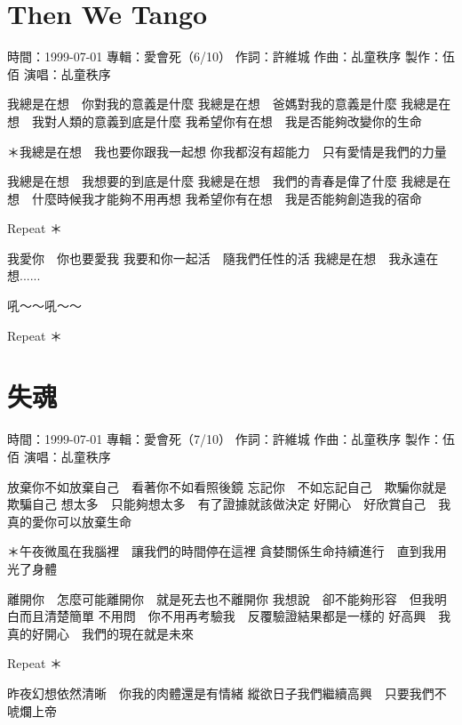 \documentclass[UTF8,a4paper,oneside,twocolumn,12pt]{ctexbook}
\newcommand{\infopair}[2]{\textbullet #1：#2}
\newcommand{\zc}[1][伍佰]{\infopair{作詞}{#1}}
\newcommand{\zq}[1][伍佰]{\infopair{作曲}{#1}}
\newcommand{\zj}[1]{\infopair{專輯}{#1}}
\newcommand{\zz}[1]{\infopair{製作}{#1}}
\newcommand{\sj}[1]{\infopair{時間}{#1}}
\newenvironment{info}{\begin{flushleft}\kaishu
	}
	{\end{flushleft}\normalsize\yahei\par}
\newenvironment{lyric}{
	}
{}
\begin{document}
\section{Then We Tango}
\begin{info}
	\sj{1999-07-01}
	\zj{愛會死（6/10）}
	\zc[許維城]
	\zq[乩童秩序]
	\zz{伍佰}
	\infopair{演唱}{乩童秩序}
\end{info}
\begin{lyric}
	我總是在想　你對我的意義是什麼
	我總是在想　爸媽對我的意義是什麼
	我總是在想　我對人類的意義到底是什麼
	我希望你有在想　我是否能夠改變你的生命

	＊我總是在想　我也要你跟我一起想
	你我都沒有超能力　只有愛情是我們的力量

	我總是在想　我想要的到底是什麼
	我總是在想　我們的青春是偉了什麼
	我總是在想　什麼時候我才能夠不用再想
	我希望你有在想　我是否能夠創造我的宿命

	Repeat ＊

	我愛你　你也要愛我
	我要和你一起活　隨我們任性的活
	我總是在想　我永遠在想......

	吼～～吼～～

	Repeat ＊
\end{lyric}

\section{失魂}
\begin{info}
	\sj{1999-07-01}
	\zj{愛會死（7/10）}
	\zc[許維城]
	\zq[乩童秩序]
	\zz{伍佰}
	\infopair{演唱}{乩童秩序}
\end{info}
\begin{lyric}
	放棄你不如放棄自己　看著你不如看照後鏡
	忘記你　不如忘記自己　欺騙你就是欺騙自己
	想太多　只能夠想太多　有了證據就該做決定
	好開心　好欣賞自己　我真的愛你可以放棄生命

	＊午夜微風在我腦裡　讓我們的時間停在這裡
	貪婪關係生命持續進行　直到我用光了身體

	離開你　怎麼可能離開你　就是死去也不離開你
	我想說　卻不能夠形容　但我明白而且清楚簡單
	不用問　你不用再考驗我　反覆驗證結果都是一樣的
	好高興　我真的好開心　我們的現在就是未來

	Repeat ＊

	昨夜幻想依然清晰　你我的肉體還是有情緒
	縱欲日子我們繼續高興　只要我們不唬爛上帝
\end{lyric}
\end{document}

